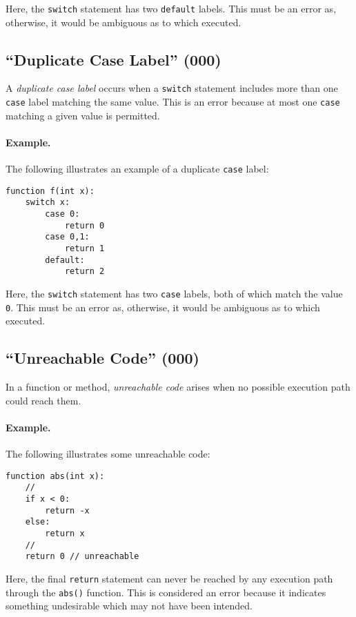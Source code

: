 Here, the \lstinline{switch} statement has two \lstinline{default} labels.  This must be an error as, otherwise, it would be ambiguous as to which executed.

\subsection{``Duplicate Case Label'' (000)}
A {\em duplicate case label} occurs when a \lstinline{switch} statement includes more than one \lstinline{case} label matching the same value.  This is an error because at most one \lstinline{case} matching a given value is permitted.

\paragraph{Example.}  The following illustrates an example of a duplicate \lstinline{case} label:

\begin{lstlisting}
function f(int x):
    switch x:
        case 0:
            return 0
        case 0,1:
            return 1
        default:
            return 2
\end{lstlisting}

Here, the \lstinline{switch} statement has two \lstinline{case} labels, both of which match the value \lstinline{0}.  This must be an error as, otherwise, it would be ambiguous as to which executed.

\subsection{``Unreachable Code'' (000)}

In a function or method, {\em unreachable code} arises when no possible execution path could reach them.  

\paragraph{Example.} The following illustrates some unreachable code:

\begin{lstlisting}
function abs(int x):
    //
    if x < 0:
        return -x
    else:
        return x
    //
    return 0 // unreachable
\end{lstlisting}

Here, the final \lstinline{return} statement can never be reached by any execution path through the \lstinline{abs()} function.  This is considered an error because it indicates something undesirable which may not have been intended.

